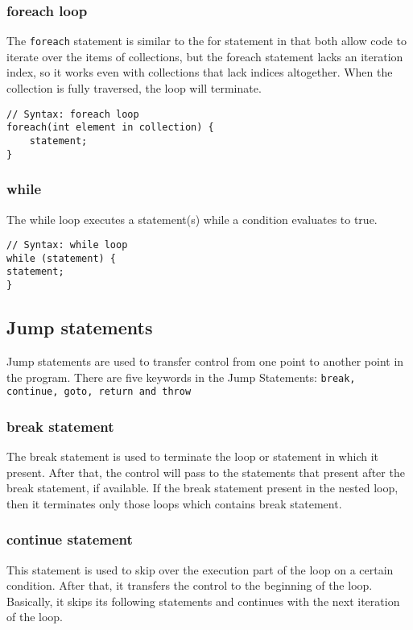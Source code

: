 \subsubsection{foreach loop}
The \verb|foreach| statement is similar to the for statement in that both allow code to iterate over the items of collections, but the foreach statement lacks an iteration index, so it works even with collections that lack indices altogether. When the collection is fully traversed, the loop will terminate.
\begin{lstlisting}[numbers=none]
// Syntax: foreach loop
foreach(int element in collection) {
	statement;
}
\end{lstlisting}


\subsubsection{while}
The while loop executes a statement(s) while a condition evaluates to true.
\begin{lstlisting}[numbers=none]
// Syntax: while loop
while (statement) {
statement;
}
\end{lstlisting}

\subsection{Jump statements}
 Jump statements are used to transfer control from one point to another point in the program. There are five keywords in the Jump Statements: \texttt{break, continue, goto, return and throw}


\subsubsection*{break statement}
The break statement is used to terminate the loop or statement in which it present. After that, the control will pass to the statements that present after the break statement, if available. If the break statement present in the nested loop, then it terminates only those loops which contains break statement.

\subsubsection*{continue statement}
This statement is used to skip over the execution part of the loop on a certain condition. After that, it transfers the control to the beginning of the loop. Basically, it skips its following statements and continues with the next iteration of the loop.

